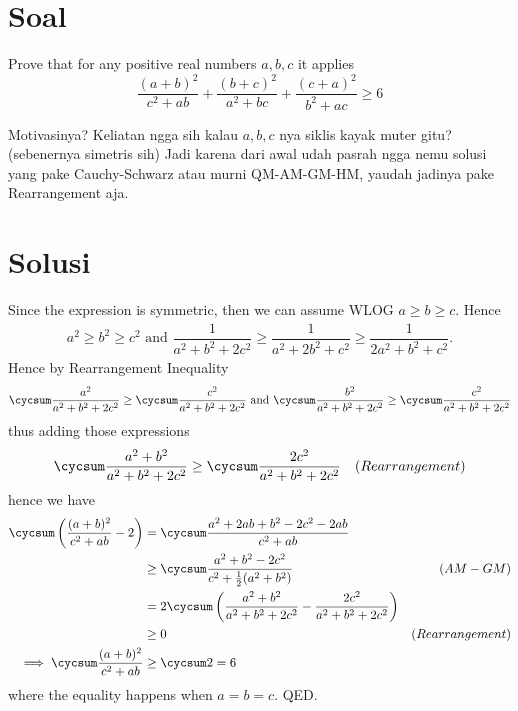 \section{Soal}
Prove that for any positive real numbers $a,b,c$ it applies
\[
\frac{(a+b)^2}{c^2 + ab} + \frac{(b+c)^2}{a^2 + bc} + \frac{(c+a)^2}{b^2 + ac} \geq 6
\]

\newpage
\begin{motivasi*}
    Motivasinya? Keliatan ngga sih kalau $a,b,c$ nya siklis kayak muter gitu? (sebenernya simetris sih) Jadi karena dari awal udah pasrah ngga nemu solusi yang pake Cauchy-Schwarz atau murni QM-AM-GM-HM, yaudah jadinya pake Rearrangement aja.
\end{motivasi*}


\section{Solusi}
    Since the expression is symmetric, then we can assume WLOG $a \ge b \ge c$. Hence
    \begin{align*}
        a^2 \ge b^2 \ge c^2  \text{ and }
        \dfrac{1}{a^2+b^2+2c^2} \ge \dfrac{1}{a^2+2b^2+c^2} \ge \dfrac{1}{2a^2+b^2+c^2}.
    \end{align*}
    Hence by Rearrangement Inequality
    \begin{align*}
        \cycsum \dfrac{a^2}{a^2+b^2+2c^2} \ge  \cycsum \dfrac{c^2}{a^2+b^2+2c^2} \text{ and }
        \cycsum \dfrac{b^2}{a^2+b^2+2c^2} \ge  \cycsum \dfrac{c^2}{a^2+b^2+2c^2}
    \end{align*}
    thus adding those expressions
    \begin{align*}
        \cycsum \dfrac{a^2+b^2}{a^2+b^2+2c^2} &\ge \cycsum \dfrac{2c^2}{a^2+b^2+2c^2} & (Rearrangement)
    \end{align*}   
    hence we have
    \begin{align*}
        \cycsum\left( \dfrac{(a+b)^2}{c^2+ab} - 2\right)
        &= \cycsum \dfrac{a^2+2ab+b^2-2c^2-2ab}{c^2+ab}\\
        &\ge \cycsum \dfrac{a^2+b^2-2c^2}{c^2+\frac{1}{2}(a^2+b^2)} & (AM-GM)\\
        &= 2\cycsum \left(\dfrac{a^2+b^2}{a^2+b^2+2c^2} - \dfrac{2c^2}{a^2+b^2+2c^2}\right)\\
        &\ge 0 & (Rearrangement) \\
        \implies \cycsum\dfrac{(a+b)^2}{c^2+ab} &\ge \cycsum 2 = 6
    \end{align*}
    where the equality happens when $a=b=c$. QED.